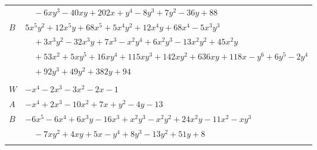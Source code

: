 \documentclass[11pt]{article}
\begin{document}
\begin{longtable}{@{}ll@{}}
 & $\quad -6xy^{3}-40xy+202x+y^{4}-8y^{3}+7y^{2}-36y+88$\\
$B$ & $5x^{5}y^{2}+12x^{5}y+68x^{5}+5x^{4}y^{2}+12x^{4}y+68x^{4}-5x^{3}y^{3}$\\
 & $\quad +3x^{3}y^{2}-32x^{3}y+7x^{3}-x^{2}y^{4}+6x^{2}y^{3}-13x^{2}y^{2}+45x^{2}y$\\
 & $\quad +53x^{2}+5xy^{5}+16xy^{4}+115xy^{3}+142xy^{2}+636xy+118x-y^{6}+6y^{5}-2y^{4}$\\
 & $\quad +92y^{3}+49y^{2}+382y+94$\\
\addlinespace[3pt]
\multicolumn{2}{@{}l}{$g=2$, $i=44$, $m=1$, neighbours $29,2,7,11,39$}\\
$W$ & $-x^{4}-2x^{3}-3x^{2}-2x-1$\\
$A$ & $-x^{4}+2x^{3}-10x^{2}+7x+y^{2}-4y-13$\\
$B$ & $-6x^{5}-6x^{4}+6x^{3}y-16x^{3}+x^{2}y^{3}-x^{2}y^{2}+24x^{2}y-11x^{2}-xy^{3}$\\
 & $\quad -7xy^{2}+4xy+5x-y^{4}+8y^{3}-13y^{2}+51y+8$\\
\addlinespace[3pt]
\end{longtable}
\endgroup
\end{document}
